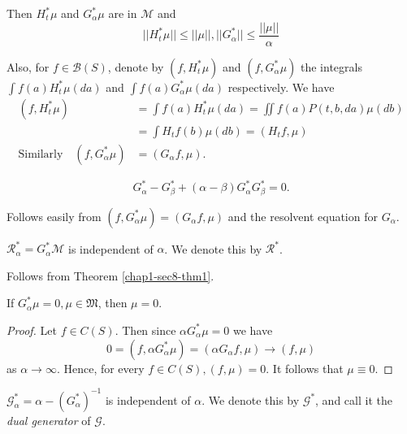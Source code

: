 Then $H^*_t \mu$ and $G^*_\alpha \mu$ are in $\mathscr{M}$ and 
$$
|| H^* _t \mu || \leq || \mu || , || G^* _\alpha || \leq \frac{|| \mu
  ||}{\alpha } 
$$
 
Also, for $f \in \mathscr{B}(S)$, denote by $(f, H^* _t \mu) $ and
 $(f,G^{\ast}_{\alpha}\mu)$ the
 integrals $\int f (a) H^*_t \mu (da)$ and $\int f (a) G^* _\alpha \mu
 (da)$ respectively. We have  
 \begin{align*}
   (f , H^*_t \mu ) & = \int f (a) H_t^*\mu (da) = \iint  f(a) P(t , b,
   da) \mu (db)\\ 
   &  = \int H_t f (b) \mu (db)= (H_t f, \mu) \\
 \text{Similarly}\quad  (f, G^*_\alpha \mu) & = (G_\alpha f, \mu ). 
 \end{align*}\pageoriginale 

\setcounter{thm}{0} 
\begin{thm}\label{chap1-sec8-thm1}
$$
G^*_\alpha -  G^*_\beta + ( \alpha - \beta )    G^* _\alpha G^*_\beta =0.
$$
\end{thm} 

 Follows easily from $(f, G^*_{\alpha} \mu) = (G_\alpha f, \mu )$ and
 the resolvent equation for $G_\alpha$. 

\begin{thm}\label{chap1-sec8-thm2}%
  $\mathscr{R}_\alpha ^* = G_\alpha ^* \mathscr{M}$ is independent of
  $\alpha$. We denote this by $\mathscr{R}^*$.  
\end{thm} 

Follows from Theorem \ref{chap1-sec8-thm1}. 
\begin{thm}\label{chap1-sec8-thm3}%
  If $G^*_\alpha \mu = 0, \mu \in \mathfrak{M}$, then $\mu = 0$. 
\end{thm} 

\begin{proof}
  Let $f \in C(S)$. Then since $\alpha G^*_\alpha \mu = 0$ we have 
$$
0 = (f , \alpha G^*_\alpha \mu) = (\alpha G_\alpha f, \mu ) \to (f,\mu)
$$
as $\alpha \to \infty$. Hence, for every $f \in C(S), (f, \mu) =
  0$. It follows that $\mu \equiv 0$.  
\end{proof} 

\begin{thm}\label{chap1-sec8-thm4}%
  $\mathscr{G}_\alpha ^* = \alpha - (G^* _\alpha)^{ -1}$ is
  independent of $\alpha$. We denote this by $\mathscr{G}^* $, and
  call it the {\em dual generator } of $\mathscr{G}$.  
\end{thm} 
 
